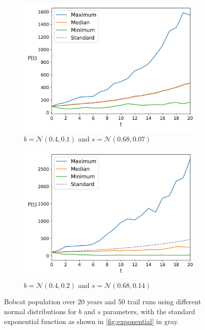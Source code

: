 \documentclass{article}
\begin{document}
\begin{figure}[h]
    \centering
    \begin{subfigure}{.5\textwidth}
        \centering
        \includegraphics[width=.95\linewidth]{./plots/demographic.png}
        \caption{$b = \mathcal{N}(0.4,0.1)$ and $s = \mathcal{N}(0.68, 0.07)$}
        \label{fig:demographic-standard}
    \end{subfigure}%
    \begin{subfigure}{.5\textwidth}
        \centering
        \includegraphics[width=.95\linewidth]{./plots/demographic_higher_dev.png}
        \caption{$b = \mathcal{N}(0.4,0.2)$ and $s = \mathcal{N}(0.68, 0.14)$}
        \label{fig:demographic-higher}
    \end{subfigure}
    \caption{Bobcat population over 20 years and 50 trail runs using different normal distributions for $b$ and $s$ parameters, with the standard exponential function as shown in \cref{fig:exponential} in gray.}
    \label{fig:demographic}
\end{figure}
\end{document}
